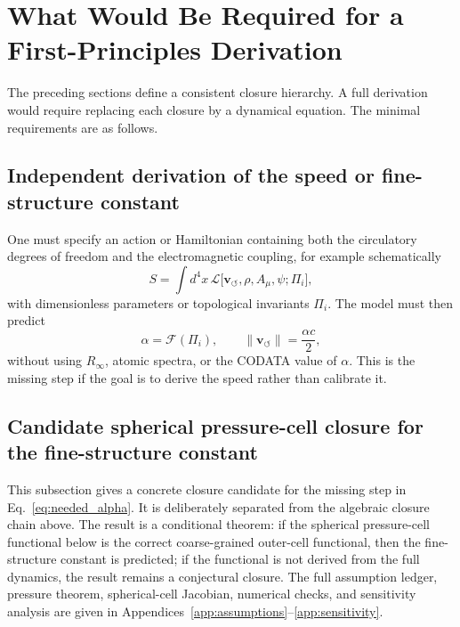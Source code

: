 \documentclass[aps,pra,preprint,longbibliography,nofootinbib]{revtex4-2}
\newcommand{\vnorm}{\lVert\mathbf{v}_{\!\boldsymbol{\circlearrowleft}}\rVert} %
\begin{document}
\section{What Would Be Required for a First-Principles Derivation}
\label{sec:requirements}

The preceding sections define a consistent closure hierarchy.  A full
derivation would require replacing each closure by a dynamical equation.
The minimal requirements are as follows.

\subsection{Independent derivation of the speed or fine-structure constant}

One must specify an action or Hamiltonian containing both the
circulatory degrees of freedom and the electromagnetic coupling, for
example schematically
\begin{equation}
  S = \int d^4x\,\mathcal{L}\bigl[\mathbf{v}_{\!\boldsymbol{\circlearrowleft}},
  \rho, A_\mu, \psi;\Pi_i\bigr],
  \label{eq:needed_action}
\end{equation}
with dimensionless parameters or topological invariants $\Pi_i$.  The
model must then predict
\begin{equation}
  \alpha = \mathcal{F}(\Pi_i),
  \qquad
  \vnorm = \frac{\alpha c}{2},
  \label{eq:needed_alpha}
\end{equation}
without using $R_\infty$, atomic spectra, or the CODATA value of
$\alpha$.  This is the missing step if the goal is to derive the speed
rather than calibrate it.


\subsection{Candidate spherical pressure-cell closure for the fine-structure constant}
\label{sec:spherical_cell}

This subsection gives a concrete closure candidate for the missing step in
Eq.~\eqref{eq:needed_alpha}.  It is deliberately separated from the
algebraic closure chain above.  The result is a conditional theorem: if the
spherical pressure-cell functional below is the correct coarse-grained
outer-cell functional, then the fine-structure constant is predicted; if the
functional is not derived from the full dynamics, the result remains a
conjectural closure.  The full assumption ledger, pressure theorem,
spherical-cell Jacobian, numerical checks, and sensitivity analysis are
given in Appendices~\ref{app:assumptions}--\ref{app:sensitivity}.
\end{document}

